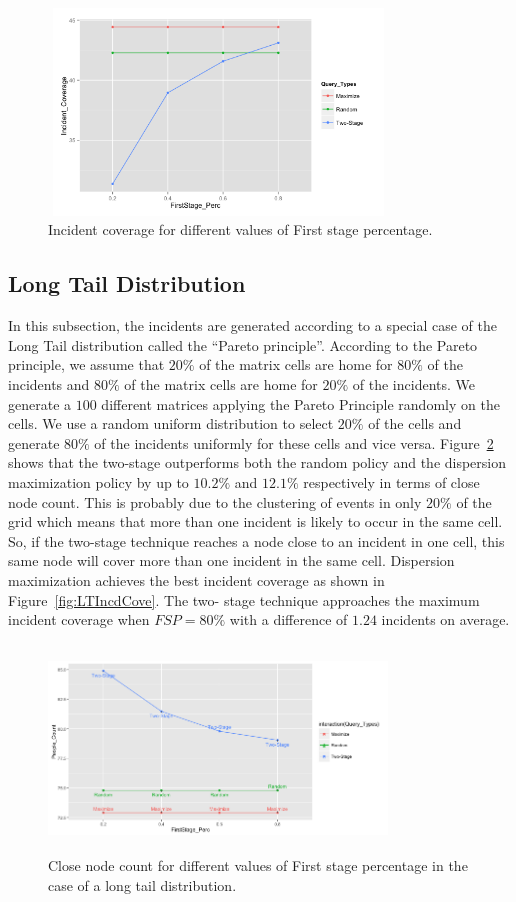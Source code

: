 \documentclass{acm_proc_article-sp}
\begin{document}
\begin{figure}[!h]
\centering
\includegraphics[width=9cm ,height=5.5cm]{figuresPng/Uni-Inc_Coverage.png}
\caption{Incident coverage for different values of First stage percentage. }
\label{fig:uniIncdCove}
\end{figure}
\subsection{Long Tail Distribution}
In this subsection, the incidents are generated according to a special case of the Long Tail distribution called the ``Pareto principle''. According to the Pareto principle, we assume that $20\%$ of the matrix cells are home for $80\%$ of the incidents and $80\%$ of the matrix cells are home for $20\%$ of the incidents. We generate a $100$ different matrices applying the Pareto Principle randomly on the cells. We use a random uniform distribution to select $20\%$ of the cells and generate $80\%$ of the incidents uniformly for these cells and vice versa. Figure~\ref{fig:LTClosePeople} shows that the two-stage outperforms both the random policy and the dispersion maximization policy by up to $10.2\%$ and $12.1\%$ respectively in terms of close node count. This is probably due to the clustering of events in only $20\%$ of the grid which means that more than one incident is likely to occur in the same cell. So, if the two-stage technique reaches a node close to an incident in one cell, this same node will cover more than one incident in the same cell. Dispersion maximization achieves the best incident coverage as shown in Figure~\ref{fig:LTIncdCove}. The two- stage technique approaches the maximum incident coverage when $FSP = 80\%$ with a difference of $1.24$ incidents on average.
\begin{figure}[!h]
\centering
\includegraphics[width=9cm ,height=5.5cm]{figuresPng/LT-closePeople.png}
\caption{Close node count for different values of First stage percentage in the case of a long tail distribution. }
\label{fig:LTClosePeople}
\end{figure}
\end{document}
